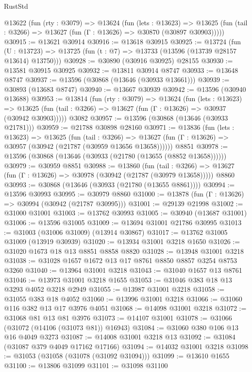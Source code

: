 \begin{lexlean}{RustStd}
\begin{coremodule}
  @13622
    (fun (rty : @3079) =>
    @13624
      (fun (lets : @13623) =>
      @13625 (fun (tail : @3266) => @13627 (fun (Γ : @13626) => @30870 (@30897 @30903)))))
@30915 := @13621 @30914
@30916 := @13618 @30915
@30925 := @13724
    (fun (U : @13723) => @13725 (fun (t : @7) => @13733 (@13596 (@13739 @28157 @13614) @13750)))
@30928 := @30890 (@30916 @30925) @28155
@30930 := @13581 @30915 @30925
@30932 := @13811 @30914 @8747
@30933 := @13648 @8747
@30937 := @13596 (@30868 (@13646 (@30933 @13661)))
@30939 := @30893 (@13683 @8747)
@30940 := @13667 @30939
@30942 := @13596 (@30940 @13688)
@30953 := @13814
    (fun (rty : @3079) =>
    @13624
      (fun (lets : @13623) =>
      @13625 (fun (tail : @3266) => @13627 (fun (Γ : @13626) => @30937 (@30942 @30903)))))
    @3082
@30957 := @13596 (@30868 (@13646 (@30933 @21781)))
@30959 := @21788 @30898 @28160
@30971 := @13836
    (fun (lets : @13623) =>
    @13625
      (fun (tail : @3266) =>
      @13627 (fun (Γ : @13626) => @30957 (@30942 (@21787 (@30959 @13656 @13658))))))
    @8851
@30978 := @13596 (@30868 (@13646 (@30933 (@21780 (@13655 (@8852 @13658))))))
@30979 := @30959 @8851
@30988 := @13860
    (fun (tail : @3266) => @13627 (fun (Γ : @13626) => @30978 (@30942 (@21787 (@30979 @13658)))))
    @8860
@30993 := @30868 (@13646 (@30933 (@21780 (@13655 @8861))))
@30994 := @13596 @30993
@30995 := @30979 @8860
@31000 := @13878 (fun (Γ : @13626) => @30994 (@30942 (@21787 @30995)))
@31001 := @29139 @21998
@31002 := @31000 @31001
@31003 := @13762 @30993
@31005 := @30940 (@13687 @31001)
@31006 := @13596 @31005
@31009 := @13694 @31001 @21786 @30995
@31013 := @31003 (@31006 @31009) (@13914 @30867)
@31017 := @13762 @31005 @31009 (@13919 @30939)
@31020 := @13934 @31001 @3218 @1650
@31026 := @31020 @1673 @18 @13 @8851 @8858 @8820
@31028 := @13948 @31001 @3218
@31038 := @31028 @1657 @1672 @13 @17 @8761 @8850 @8857 @3254 @8753 @3260
@31040 := @13964 @31001 @3218
@31043 := @31040 @1657 @13 @8761
@31046 := @13973 @31001 @3218 @1655
@31053 := @31046 @383 @18 @13 @3293 @4052 @3218 @2949
@31055 := @13987 @31001 @3218
@31058 := @31055 @383 @18 @4052
@31060 := @13996 @31001 @3218
@31066 := @31060 @116 @382 @13 @17 @3976 @4051
@31068 := @14098 @31001 @3218
@31072 := @31068 @81 @13 @81 @3976
@31073 := @14107 @31001
@31078 := @31066 (@31072 (@14106 (@31073 @81)) @16943)
@31084 := @31060 @380 @106 @13 @16 @4049 @3273
@31087 := @14008 @31001 @3218 @13
@31092 := @31084 (@31087 @379 @4049 @17162 @17166)
@31094 := @14032 @31001 @3218
@31098 := @31053 (@31058 (@31078 (@31092 @31094)))
@31099 := @13610 @1655
@31100 := @13806 @31099
@31101 := @31098 @31100

\end{coremodule}
\end{lexlean}
